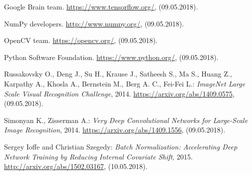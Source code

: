 \documentclass[a4paper]{article}
\begin{document}

\clearpage
\begin{thebibliography}{99}

 Google Brain team. \url{https://www.tensorflow.org/}, (09.05.2018).

 NumPy developers. \url{http://www.numpy.org/}, (09.05.2018).

 OpenCV team. \url{https://opencv.org/}, (09.05.2018).

 Python Software Foundation. \url{https://www.python.org/}, (09.05.2018).

Russakovsky O., Deng J., Su H., Krause J., Satheesh S., Ma S., Huang Z., Karpathy A., Khosla A., Bernstein M., Berg A. C., Fei-Fei L.: \textit{ImageNet Large Scale Visual Recognition Challenge}, 2014. 
\url{https://arxiv.org/abs/1409.0575}, (09.05.2018).

Simonyan K., Zisserman A.: \textit{Very Deep Convolutional Networks for Large-Scale Image Recognition}, 2014. \url{https://arxiv.org/abs/1409.1556}, (09.05.2018).

 Sergey Ioffe and Christian Szegedy: \textit{Batch Normalization: Accelerating Deep Network Training by Reducing Internal Covariate Shift}, 2015. \url{http://arxiv.org/abs/1502.03167}, (10.05.2018).

\end{thebibliography}
\end{document}
